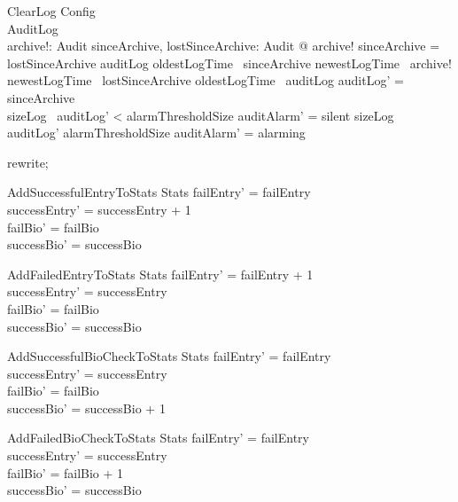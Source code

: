 \begin{schema}{ClearLog}
  Config\\
  \Delta AuditLog\\
  archive!: \finset  Audit
\where
  \exists  sinceArchive, lostSinceArchive: \finset  Audit @ 
    archive! \cup  sinceArchive = lostSinceArchive \cup  auditLog \land
    oldestLogTime~ sinceArchive \geq  newestLogTime~ archive! \land
    newestLogTime~ lostSinceArchive \leq  oldestLogTime~ auditLog \land
    auditLog' = sinceArchive\\
  sizeLog~ auditLog' < alarmThresholdSize \land
  auditAlarm' = silent \lor  sizeLog~ auditLog' \geq  alarmThresholdSize \land  auditAlarm' = alarming
\end{schema}

\begin{zproof}
rewrite;
\end{zproof}

\begin{schema}{AddSuccessfulEntryToStats}
  \Delta Stats
\where
  failEntry' = failEntry\\
  successEntry' = successEntry + 1\\
  failBio' = failBio\\
  successBio' = successBio
\end{schema}

\begin{schema}{AddFailedEntryToStats}
  \Delta Stats
\where
  failEntry' = failEntry + 1\\
  successEntry' = successEntry\\
  failBio' = failBio\\
  successBio' = successBio
\end{schema}

\begin{schema}{AddSuccessfulBioCheckToStats}
  \Delta Stats
\where
  failEntry' = failEntry\\
  successEntry' = successEntry\\
  failBio' = failBio\\
  successBio' = successBio + 1
\end{schema}

\begin{schema}{AddFailedBioCheckToStats}
  \Delta Stats
\where
  failEntry' = failEntry\\
  successEntry' = successEntry\\
  failBio' = failBio + 1\\
  successBio' = successBio
\end{schema}

